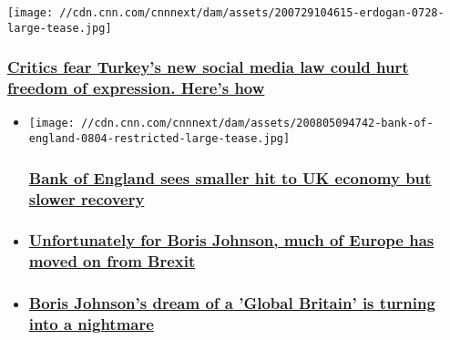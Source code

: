 \href{/2020/07/29/europe/turkey-social-media-law-intl/index.html}{}

\texttt{[image: //cdn.cnn.com/cnnnext/dam/assets/200729104615-erdogan-0728-large-tease.jpg]}

\hypertarget{critics-fear-turkeys-new-social-media-law-could-hurt-freedom-of-expression-heres-how}{%
\subsubsection{\texorpdfstring{\href{/2020/07/29/europe/turkey-social-media-law-intl/index.html}{Critics
fear Turkey's new social media law could hurt freedom of expression.
Here's
how}}{Critics fear Turkey's new social media law could hurt freedom of expression. Here's how}}\label{critics-fear-turkeys-new-social-media-law-could-hurt-freedom-of-expression-heres-how}}

\begin{itemize}
\item
  \href{/2020/08/06/economy/bank-of-england-uk-economy/index.html}{}

  \texttt{[image: //cdn.cnn.com/cnnnext/dam/assets/200805094742-bank-of-england-0804-restricted-large-tease.jpg]}

  \hypertarget{bank-of-england-sees-smaller-hit-to-uk-economy-but-slower-recovery}{%
  \subsubsection{\texorpdfstring{\href{/2020/08/06/economy/bank-of-england-uk-economy/index.html}{Bank
  of England sees smaller hit to UK economy but slower
  recovery}}{Bank of England sees smaller hit to UK economy but slower recovery}}\label{bank-of-england-sees-smaller-hit-to-uk-economy-but-slower-recovery}}
\item
  \hypertarget{unfortunately-for-boris-johnson-much-of-europe-has-moved-on-from-brexit}{%
  \subsubsection{\texorpdfstring{\href{/2020/07/29/uk/eu-brexit-intl-gbr/index.html}{Unfortunately
  for Boris Johnson, much of Europe has moved on from
  Brexit}}{Unfortunately for Boris Johnson, much of Europe has moved on from Brexit}}\label{unfortunately-for-boris-johnson-much-of-europe-has-moved-on-from-brexit}}
\item
  \hypertarget{boris-johnsons-dream-of-a-global-britain-is-turning-into-a-nightmare}{%
  \subsubsection{\texorpdfstring{\href{/2020/07/24/business/brexit-trade-deals-boris-johnson/index.html}{Boris
  Johnson's dream of a 'Global Britain' is turning into a
  nightmare}}{Boris Johnson's dream of a 'Global Britain' is turning into a nightmare}}\label{boris-johnsons-dream-of-a-global-britain-is-turning-into-a-nightmare}}
\end{itemize}

